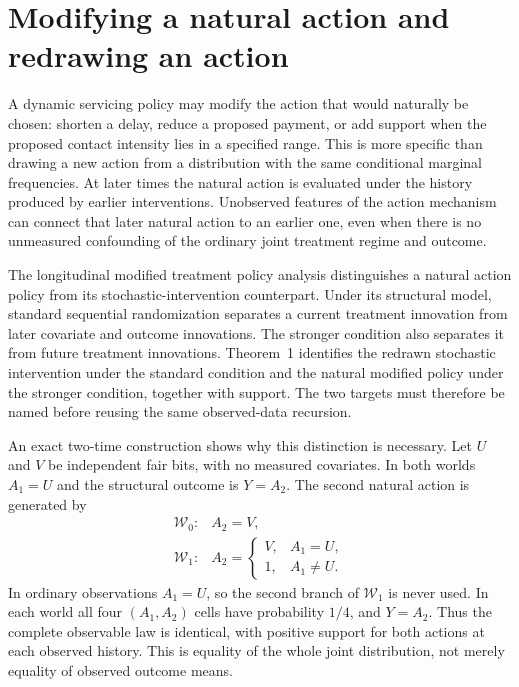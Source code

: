\section{Modifying a natural action and redrawing an action}
\label{exec17:s5-natural}

A dynamic servicing policy may modify the action that would naturally be
chosen: shorten a delay, reduce a proposed payment, or add support when the
proposed contact intensity lies in a specified range. This is more specific
than drawing a new action from a distribution with the same conditional
marginal frequencies. At later times the natural action is evaluated under
the history produced by earlier interventions. Unobserved features of the
action mechanism can connect that later natural action to an earlier one,
even when there is no unmeasured confounding of the ordinary joint treatment
regime and outcome.

The longitudinal modified treatment policy analysis distinguishes a natural
action policy from its stochastic-intervention counterpart. Under its
structural model, standard sequential randomization separates a current
treatment innovation from later covariate and outcome innovations. The
stronger condition also separates it from future treatment innovations.
Theorem~1 identifies the redrawn stochastic intervention under the standard
condition and the natural modified policy under the stronger condition,
together with support. The two targets must therefore be named before
reusing the same observed-data recursion.\citep{lmtp2023}

An exact two-time construction shows why this distinction is necessary.
Let $U$ and $V$ be independent fair bits, with no measured covariates. In both
worlds $A_1=U$ and the structural outcome is $Y=A_2$. The second natural action
is generated by
\begin{equation}
 \begin{array}{ll}
 \mathcal W_0:& A_2=V,\\
 \mathcal W_1:&
 A_2=\begin{cases}V,&A_1=U,\\1,&A_1\ne U.\end{cases}
 \end{array}
 \label{exec17:s5-two-worlds}
\end{equation}
In ordinary observations $A_1=U$, so the second branch of $\mathcal W_1$ is
never used. In each world all four $(A_1,A_2)$ cells have probability $1/4$,
and $Y=A_2$. Thus the complete observable law is identical, with positive
support for both actions at each observed history. This is equality of the
whole joint distribution, not merely equality of observed outcome means.

